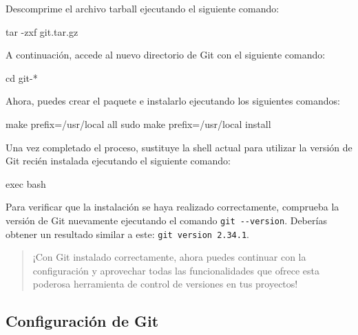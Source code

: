 \documentclass[
  letterpaper,
  DIV=11,
  numbers=noendperiod]{scrartcl}
\newenvironment{Shaded}{}{}
\newcommand{\AttributeTok}[1]{\textcolor[rgb]{0.84,0.23,0.29}{#1}}
\newcommand{\BuiltInTok}[1]{\textcolor[rgb]{0.84,0.23,0.29}{#1}}
\newcommand{\FunctionTok}[1]{\textcolor[rgb]{0.44,0.26,0.76}{#1}}
\newcommand{\NormalTok}[1]{\textcolor[rgb]{0.14,0.16,0.18}{#1}}
\newcommand{\PreprocessorTok}[1]{\textcolor[rgb]{0.84,0.23,0.29}{#1}}
\begin{document}
Descomprime el archivo tarball ejecutando el siguiente comando:

\begin{Shaded}
\begin{Highlighting}[]
\FunctionTok{tar} \AttributeTok{{-}zxf}\NormalTok{ git.tar.gz}
\end{Highlighting}
\end{Shaded}

A continuación, accede al nuevo directorio de Git con el siguiente
comando:

\begin{Shaded}
\begin{Highlighting}[]
\BuiltInTok{cd}\NormalTok{ git{-}}\PreprocessorTok{*}
\end{Highlighting}
\end{Shaded}

Ahora, puedes crear el paquete e instalarlo ejecutando los siguientes
comandos:

\begin{Shaded}
\begin{Highlighting}[]
\FunctionTok{make}\NormalTok{ prefix=/usr/local all}
\FunctionTok{sudo}\NormalTok{ make prefix=/usr/local install}
\end{Highlighting}
\end{Shaded}

Una vez completado el proceso, sustituye la shell actual para utilizar
la versión de Git recién instalada ejecutando el siguiente comando:

\begin{Shaded}
\begin{Highlighting}[]
\BuiltInTok{exec}\NormalTok{ bash}
\end{Highlighting}
\end{Shaded}

Para verificar que la instalación se haya realizado correctamente,
comprueba la versión de Git nuevamente ejecutando el comando
\texttt{git\ -\/-version}. Deberías obtener un resultado similar a este:
\texttt{git\ version\ 2.34.1}.

\begin{quote}
¡Con Git instalado correctamente, ahora puedes continuar con la
configuración y aprovechar todas las funcionalidades que ofrece esta
poderosa herramienta de control de versiones en tus proyectos!
\end{quote}

\hypertarget{configuraciuxf3n-de-git}{%
\subsection{Configuración de Git}\label{configuraciuxf3n-de-git}}
\end{document}
